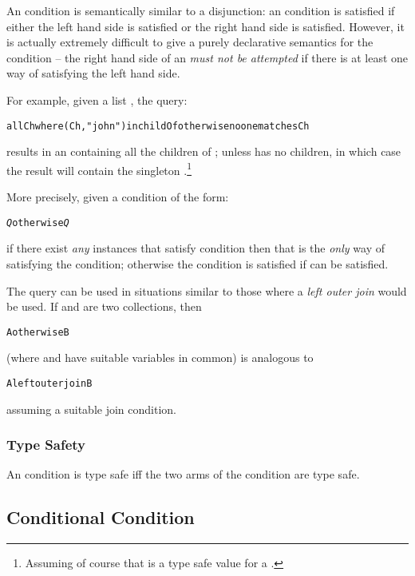 An  condition is semantically similar to a disjunction: an  condition is satisfied if either the left hand side is satisfied or the right hand side is satisfied. However, it is actually extremely difficult to give a purely declarative semantics for the  condition -- the right hand side of an  \emph{must not be attempted} if there is at least one way of satisfying the left hand side.

For example, given a list , the query:
\begin{alltt}
all Ch where (Ch,"john") in childOf otherwise noone matches Ch
\end{alltt}
results in an  containing all the children of ; unless  has no children, in which case the result will contain the singleton .\footnote{Assuming of course that  is a type safe value for a .}

More precisely, given a condition of the form:
\begin{alltt}
\emph{Q} otherwise \emph{Q}
\end{alltt}
if there exist \emph{any} instances that satisfy  condition then that is the \emph{only} way of satisfying the condition; otherwise the condition is satisfied if  can be satisfied.
\begin{aside}
The  query can be used in situations similar to those where a \emph{left outer join} would be used. If  and  are two collections, then
\begin{alltt}
A otherwise B
\end{alltt}
(where  and  have suitable variables in common) is analogous to
\begin{alltt}
A left outer join B
\end{alltt}
assuming a suitable join condition.
\end{aside}

\subsubsection{Type Safety}
An  condition is type safe iff the two arms of the condition are type safe.
\begin{prooftree}
\end{prooftree}

\subsection{Conditional Condition}
\label{conditionalQuery}


